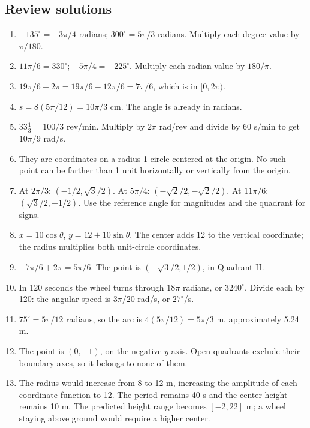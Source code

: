 \subsection{Review solutions}
\begin{enumerate}
\item \(-135^\circ=-3\pi/4\) radians; \(300^\circ=5\pi/3\) radians. Multiply each degree value by \(\pi/180\).
\item \(11\pi/6=330^\circ\); \(-5\pi/4=-225^\circ\). Multiply each radian value by \(180/\pi\).
\item \(19\pi/6-2\pi=19\pi/6-12\pi/6=7\pi/6\), which is in \([0,2\pi)\).
\item \(s=8(5\pi/12)=10\pi/3\) cm. The angle is already in radians.
\item \(33\frac13=100/3\) rev/min. Multiply by \(2\pi\) rad/rev and divide by 60 s/min to get \(10\pi/9\) rad/s.
\item They are coordinates on a radius-1 circle centered at the origin. No such point can be farther than 1 unit horizontally or vertically from the origin.
\item At \(2\pi/3\): \((-1/2,\sqrt3/2)\). At \(5\pi/4\): \((-\sqrt2/2,-\sqrt2/2)\). At \(11\pi/6\): \((\sqrt3/2,-1/2)\). Use the reference angle for magnitudes and the quadrant for signs.
\item \(x=10\cos\theta\), \(y=12+10\sin\theta\). The center adds 12 to the vertical coordinate; the radius multiplies both unit-circle coordinates.
\item \(-7\pi/6+2\pi=5\pi/6\). The point is \((-\sqrt3/2,1/2)\), in Quadrant II.
\item In 120 seconds the wheel turns through \(18\pi\) radians, or \(3240^\circ\). Divide each by 120: the angular speed is \(3\pi/20\) rad/s, or \(27^\circ\)/s.
\item \(75^\circ=5\pi/12\) radians, so the arc is \(4(5\pi/12)=5\pi/3\) m, approximately 5.24 m.
\item The point is \((0,-1)\), on the negative \(y\)-axis. Open quadrants exclude their boundary axes, so it belongs to none of them.
\item The radius would increase from 8 to 12 m, increasing the amplitude of each coordinate function to 12. The period remains 40 s and the center height remains 10 m. The predicted height range becomes \([-2,22]\) m; a wheel staying above ground would require a higher center.
\end{enumerate}
\endgroup
\clearpage
